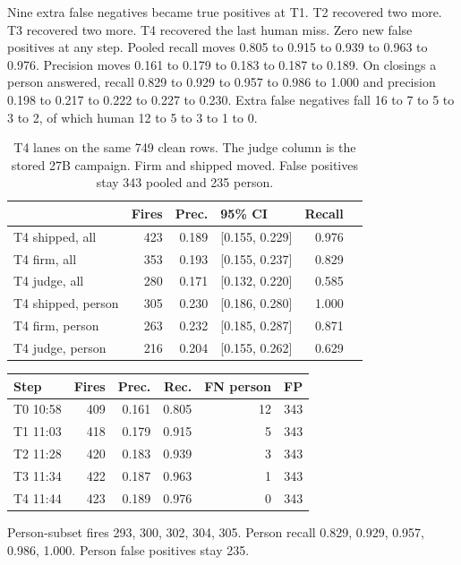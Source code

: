 Nine extra false negatives became true positives at T1. T2 recovered
two more. T3 recovered two more. T4 recovered the last human miss.
Zero new false positives at any step. Pooled recall moves 0.805 to
0.915 to 0.939 to 0.963 to 0.976. Precision moves 0.161 to 0.179 to
0.183 to 0.187 to 0.189. On closings a person answered, recall 0.829
to 0.929 to 0.957 to 0.986 to 1.000 and precision 0.198 to 0.217 to
0.222 to 0.227 to 0.230. Extra false negatives fall 16 to 7 to 5 to 3
to 2, of which human 12 to 5 to 3 to 1 to 0.


\begin{table}[ht]
\centering
{\small\begin{tabular}{lrrlrr}
\toprule
 & Fires & Prec. & 95\% CI & Recall \\
\midrule
T4 shipped, all & 423 & 0.189 & [0.155, 0.229] & 0.976 \\
T4 firm, all & 353 & 0.193 & [0.155, 0.237] & 0.829 \\
T4 judge, all & 280 & 0.171 & [0.132, 0.220] & 0.585 \\
\midrule
T4 shipped, person & 305 & 0.230 & [0.186, 0.280] & 1.000 \\
T4 firm, person & 263 & 0.232 & [0.185, 0.287] & 0.871 \\
T4 judge, person & 216 & 0.204 & [0.155, 0.262] & 0.629 \\
\bottomrule
\end{tabular}}
\caption{T4 lanes on the same 749 clean rows. The judge column is the
stored 27B campaign. Firm and shipped moved. False positives stay
343 pooled and 235 person.}
\label{tab:t4lanes}
\end{table}

\begin{center}
{\small\begin{tabular}{lrrrrr}
\toprule
Step & Fires & Prec. & Rec. & FN person & FP \\
\midrule
T0 10:58 & 409 & 0.161 & 0.805 & 12 & 343 \\
T1 11:03 & 418 & 0.179 & 0.915 & 5 & 343 \\
T2 11:28 & 420 & 0.183 & 0.939 & 3 & 343 \\
T3 11:34 & 422 & 0.187 & 0.963 & 1 & 343 \\
T4 11:44 & 423 & 0.189 & 0.976 & 0 & 343 \\
\bottomrule
\end{tabular}}
\end{center}

Person-subset fires 293, 300, 302, 304, 305. Person recall 0.829,
0.929, 0.957, 0.986, 1.000. Person false positives stay 235.

